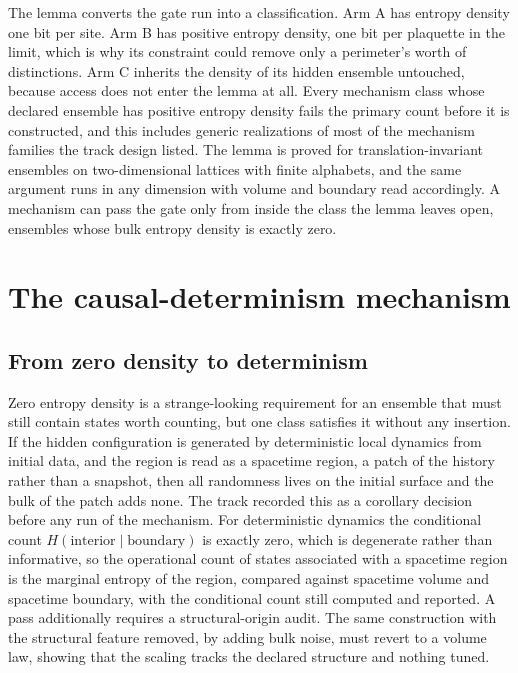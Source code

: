 \documentclass[aps,pre,reprint,nofootinbib]{revtex4-2}
\begin{document}
The lemma converts the gate run into a classification.  Arm A has
entropy density one bit per site.  Arm B has positive entropy density,
one bit per plaquette in the limit, which is why its constraint could
remove only a perimeter's worth of distinctions.  Arm C inherits the
density of its hidden ensemble untouched, because access does not enter
the lemma at all.  Every mechanism class whose declared ensemble has
positive entropy density fails the primary count before it is
constructed, and this includes generic realizations of most of the
mechanism families the track design listed.  The lemma is proved for
translation-invariant ensembles on two-dimensional lattices with finite
alphabets, and the same argument runs in any dimension with volume and
boundary read accordingly.  A mechanism can pass the gate only from
inside the class the lemma leaves open, ensembles whose bulk entropy
density is exactly zero.

\section{The causal-determinism mechanism}
\label{sec:eg1b}

\subsection{From zero density to determinism}

Zero entropy density is a strange-looking requirement for an ensemble
that must still contain states worth counting, but one class satisfies
it without any insertion.  If the hidden configuration is generated by
deterministic local dynamics from initial data, and the region is read
as a spacetime region, a patch of the history rather than a snapshot,
then all randomness lives on the initial surface and the bulk of the
patch adds none.  The track recorded this as a corollary decision before
any run of the mechanism.  For deterministic dynamics the conditional
count $H(\text{interior} \mid \text{boundary})$ is exactly zero, which
is degenerate rather than informative, so the operational count of
states associated with a spacetime region is the marginal entropy of
the region, compared against spacetime volume and spacetime boundary,
with the conditional count still computed and reported.  A pass
additionally requires a structural-origin audit.  The same construction
with the structural feature removed, by adding bulk noise, must revert
to a volume law, showing that the scaling tracks the declared structure
and nothing tuned.
\end{document}
